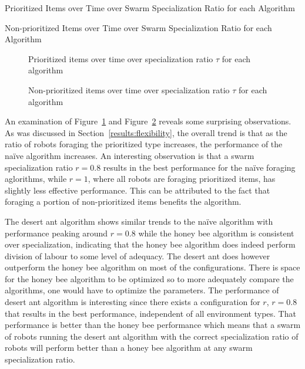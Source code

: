 \begin{table} [h]
     \caption{Prioritized Items over Time over Swarm Specialization Ratio for each Algorithm}
     \label{specializationprioritized}
	\centering
	\footnotesize
	
\end{table}

\begin{table} [h]
     \caption{Non-prioritized Items over Time over Swarm Specialization Ratio for each Algorithm}
     \label{specializationnonprioritized}
	\centering
	\footnotesize
	
\end{table}

\begin{figure}[!htb]
\centering
\resizebox{\textwidth}{!}{}
\caption{Prioritized items over time over specialization ratio $\tau$ for each algorithm }
\label{divisiongoldplot}
\end{figure}

\begin{figure}[!htb]
\centering
\resizebox{\textwidth}{!}{}
\caption{Non-prioritized items over time over specialization ratio $\tau$ for each algorithm}
\label{divisionwasteplot}
\end{figure}

An examination of Figure~\ref{divisiongoldplot} and Figure~\ref{divisionwasteplot} reveals some surprising observations.
As was discussed in Section~\ref{results:flexibility}, the overall trend is that as the ratio of robots foraging the prioritized type increases, the performance of the na\"ive algorithm increases. An interesting observation is that a swarm specialization ratio $r=0.8$ results in the best performance for the na\"ive foraging aglorithms, while $r=1$, where all robots are foraging prioritized items, has slightly less effective performance. This can be attributed to the fact that foraging a portion of non-prioritized items benefits the algorithm.

The desert ant algorithm shows similar trends to the na\"ive algorithm with performance peaking around $r=0.8$ while the honey bee algorithm is consistent over specialization, indicating that the honey bee algorithm does indeed perform division of labour to some level of adequacy. The desert ant does however outperform the honey bee algorithm on most of the configurations. There is space for the honey bee algorithm to be optimized so to more adequately compare the algorithms, one would have to optimize the parameters. 
The performance of desert ant algorithm is interesting since there exists a configuration for $r$, $r=0.8$ that results in the best performance, independent of all environment types. That performance is better than the honey bee performance which means that a swarm of robots running the desert ant algorithm with the correct specialization ratio of robots will perform better than a honey bee algorithm at any swarm specialization ratio. 

